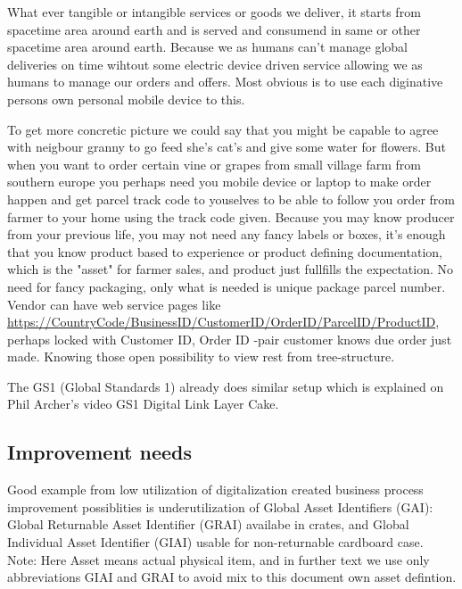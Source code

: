 What ever tangible or intangible services or goods we deliver, it starts from
spacetime area around earth and is served and consumend in same or other
spacetime area around earth. Because we as humans can't manage global deliveries
on time wihtout some electric device driven service allowing we as humans to
manage our orders and offers. Most obvious is to use each diginative persons
own personal mobile device to this.

To get more concretic picture we could say that you might be capable to agree
with neigbour granny to go feed she's cat's and give some water for flowers.
But when you want to order certain vine or grapes from small village farm from
southern europe you perhaps need you mobile device or laptop to make order
happen and get parcel track code to youselves to be able to follow you order
from farmer to your home using the track code given. Because you may know
producer from your previous life, you may not need any fancy labels or boxes,
it's enough that you know product based to experience or product defining
documentation, which is the "asset" for farmer sales, and product just
fullfills the expectation. No need for fancy packaging, only what is needed is
unique package parcel number. Vendor can have web service pages like
\url{https://CountryCode/BusinessID/CustomerID/OrderID/ParcelID/ProductID},
perhaps locked with Customer ID, Order ID -pair customer knows due order
just made. Knowing those open possibility to view rest from tree-structure.

The GS1 (Global Standards 1) already does similar setup which is explained on
Phil Archer's video GS1 Digital Link Layer Cake\cite{GS1DigitalLink}.

\subsection{Improvement needs}
\label{improvement_needs}

Good example from low utilization of digitalization created business process
improvement possiblities is underutilization of Global Asset Identifiers (GAI):
Global Returnable Asset Identifier (GRAI)
\cite{GRAI}\cite{IFCO}\cite{EUROPOOL}
availabe in crates, and Global Individual Asset Identifier (GIAI)
\cite{GIAI}\cite{CajoMakeBright} usable for non-returnable cardboard case.
Note: Here Asset means actual physical item, and in further text we use only
abbreviations GIAI and GRAI to avoid mix to this document own asset defintion.

